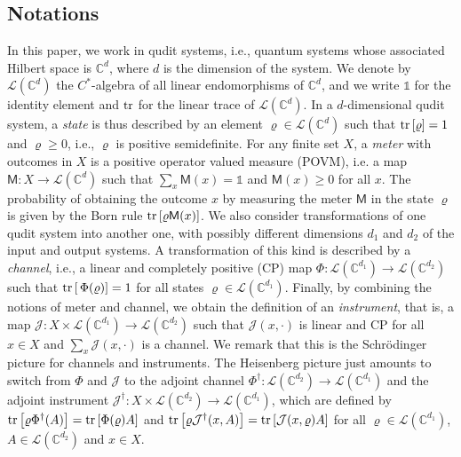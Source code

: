 \documentclass[12pt,reqno]{amsart}
\theoremstyle{definition}
\newcommand{\tr}[1]{{\rm tr}\left[#1\right]} %
\newcommand{\id}{\mathds{1}} %
\newcommand{\Mo}{\mathsf{M}}%
\newcommand{\rhoo}{\varrho} %
\newcommand{\Cb}{\mathbb{C}} %
\newcommand{\lc}[1]{\mathcal{L}(\Cb^{#1})} %
\newcommand{\ii}{\mathcal{J}}
\begin{document}
\subsection*{Notations}
In this paper, we work in qudit systems, i.e., quantum systems whose associated Hilbert space is $\Cb^d$, where $d$ is the dimension of the system. We denote by $\lc{d}$ the $C^*$-algebra of all linear endomorphisms of $\Cb^d$, and we write $\id$ for the identity element and ${\rm tr}$ for the linear trace of $\lc{d}$. In a $d$-dimensional qudit system, a {\em state} is thus described by an element $\rhoo\in\lc{d}$ such that $\tr{\rhoo} = 1$ and $\rhoo\geq 0$, i.e., $\rhoo$ is positive semidefinite. 
For any finite set $X$, a \emph{meter} with outcomes in $X$ is a positive operator valued measure (POVM), i.e. a map $\Mo:X\to\lc{d}$ such that $\sum_x \Mo(x) = \id$ and $\Mo(x)\geq 0$ for all $x$. 
The probability of obtaining the outcome $x$ by measuring the meter $\Mo$ in the state $\rhoo$ is given by the Born rule $\tr{\rhoo\Mo(x)}$. 
We also consider transformations of one qudit system into another one, with possibly different dimensions $d_1$ and $d_2$ of the input and output systems. A transformation of this kind is described by a {\em channel}, i.e., a linear and completely positive (CP) map $\Phi:\lc{d_1}\to\lc{d_2}$ such that $\tr{\,\Phi(\rhoo)} = 1$ for all states $\rhoo\in\lc{d_1}$. 
Finally, by combining the notions of meter and channel, we obtain the definition of an {\em instrument}, that is, a map $\ii:X\times\lc{d_1}\to\lc{d_2}$ such that $\ii(x,\cdot)$ is linear and CP for all $x\in X$ and $\sum_x \ii(x,\cdot)$ is a channel. We remark that this is the Schr\"odinger picture for channels and instruments. 
The Heisenberg picture just amounts to switch from $\Phi$ and $\ii$ to the adjoint channel $\Phi^\dag:\lc{d_2}\to\lc{d_1}$ and the adjoint instrument $\ii^\dag:X\times\lc{d_2}\to\lc{d_1}$, which are defined by $\tr{\rhoo\Phi^\dag(A)} = \tr{\Phi(\rhoo)A}$ and $\tr{\rhoo\ii^\dag(x,A)} = \tr{\ii(x,\rhoo)A}$ for all $\rhoo\in\lc{d_1}$, $A\in\lc{d_2}$ and $x\in X$.
\end{document}
